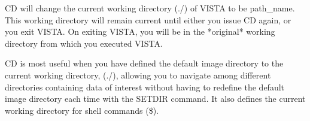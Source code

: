 CD will change the current working directory (./) of VISTA to be
path\_name.  This working directory will remain current until either you
issue CD again, or you exit VISTA.  On exiting VISTA, you will be in the
*original* working directory from which you executed VISTA.
 
CD is most useful when you have defined the default image directory to the
current working directory, (./), allowing you to navigate among different
directories containing data of interest without having to redefine the
default image directory each time with the SETDIR command.  It also defines
the current working directory for shell commands (\$).
 
